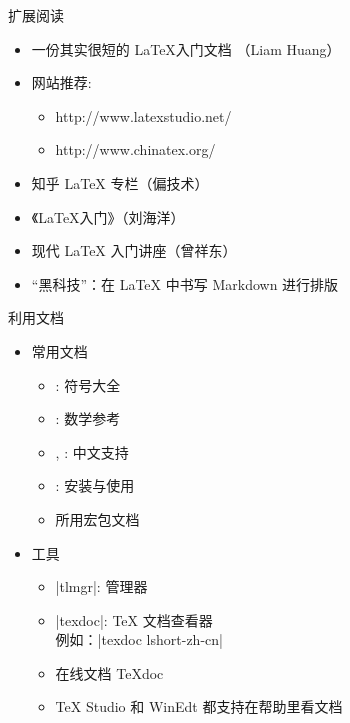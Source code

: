 \begin{frame}{扩展阅读}
  \begin{itemize}
    \item 一份其实很短的 \LaTeX 入门文档 （Liam Huang） 
    \item 网站推荐:
          \begin{itemize}
            \item http://www.latexstudio.net/
            \item http://www.chinatex.org/
          \end{itemize}
    \item 知乎 \LaTeX{} 专栏（偏技术）
    \item 《\LaTeX{}入门》（刘海洋）
    \item 现代 LaTeX 入门讲座（曾祥东）
    \item “黑科技”：在 \LaTeX{} 中书写 Markdown 进行排版 
  \end{itemize}
\end{frame}


\begin{frame}[fragile]{利用文档}
  \begin{itemize}
    \item 常用文档
          \begin{itemize}
            \item {}: 符号大全
            \item {}: 数学参考
            \item {}, : 中文支持
            \item {}: \TL 安装与使用
            \item 所用宏包文档
          \end{itemize}
    \item 工具
          \begin{itemize}
            \item |tlmgr|: \TL 管理器
            \item |texdoc|: \TeX{} 文档查看器\\
                  例如：|texdoc lshort-zh-cn|
            \item 在线文档 \TeX{}doc 
            \item TeX Studio 和 WinEdt 都支持在帮助里看文档
          \end{itemize}
  \end{itemize}
\end{frame}

